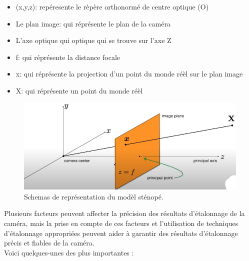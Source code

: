 \begin{itemize}
	\item (x,y,z): repéresente le rèpère orthonormé de centre optique (O)
	\item  Le plan image: qui réprésente le plan de la caméra 
	\item  L'axe optique qui optique qui se trouve sur l'axe Z
	\item  f: qui réprésente la distance focale
	\item  x: qui réprésente la projection d'un point du monde réèl sur le plan image
	\item  X: qui réprésente un point du monde réèl
\end{itemize}
\vspace{-0.3 cm}
\begin{figure}[h]
	\centering
	\includegraphics[scale=0.70]{image/ModelStenope.png}
	\decoRule
	\caption[Représentation du modèl sténopé]{Schemas de représentation du modèl sténopé.}
	\label{fig:Représentation du modèl sténopé}
\end{figure}


Plusieurs facteurs peuvent affecter la précision des résultats d’étalonnage de la caméra, mais la prise en compte de ces facteurs et l’utilisation de techniques d’étalonnage appropriées peuvent aider à garantir des résultats d’étalonnage précis et fiables de la caméra. \\

Voici quelques-unes des plus importantes : \\

